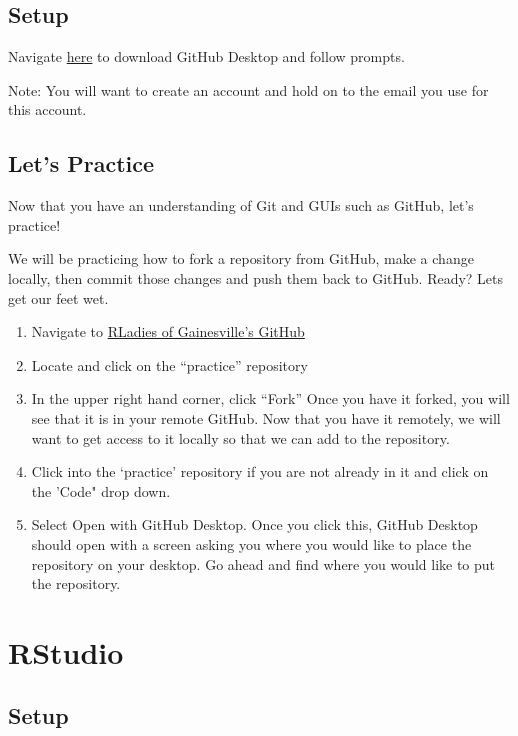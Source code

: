 \documentclass[
]{article}
\providecommand{\tightlist}{%
  \setlength{\itemsep}{0pt}\setlength{\parskip}{0pt}}
\begin{document}
\hypertarget{setup}{%
\subsection{Setup}\label{setup}}

Navigate \href{https://desktop.github.com}{here} to download GitHub
Desktop and follow prompts.

Note: You will want to create an account and hold on to the email you
use for this account.

\hypertarget{lets-practice}{%
\subsection{Let's Practice}\label{lets-practice}}

Now that you have an understanding of Git and GUIs such as GitHub, let's
practice!

We will be practicing how to fork a repository from GitHub, make a
change locally, then commit those changes and push them back to GitHub.
Ready? Lets get our feet wet.

\begin{enumerate}
\def\labelenumi{\arabic{enumi}.}
\tightlist
\item
  Navigate to \href{https://github.com/R-Ladies-Gainesville}{RLadies of
  Gainesville's GitHub}
\item
  Locate and click on the ``practice'' repository
\item
  In the upper right hand corner, click ``Fork'' Once you have it
  forked, you will see that it is in your remote GitHub. Now that you
  have it remotely, we will want to get access to it locally so that we
  can add to the repository.
\item
  Click into the `practice' repository if you are not already in it and
  click on the 'Code" drop down.
\item
  Select Open with GitHub Desktop. Once you click this, GitHub Desktop
  should open with a screen asking you where you would like to place the
  repository on your desktop. Go ahead and find where you would like to
  put the repository.
\end{enumerate}

\hypertarget{rstudio}{%
\section{RStudio}\label{rstudio}}

\hypertarget{setup-1}{%
\subsection{Setup}\label{setup-1}}
\end{document}
